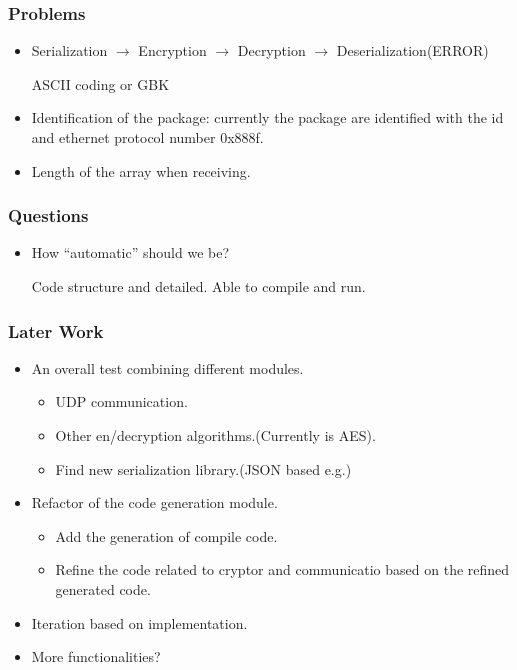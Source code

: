 \documentclass[11pt]{beamer}
\begin{document}
\begin{frame}
\begin{multicols}{2}
\end{multicols}
\end{frame}

\begin{frame}\frametitle{Problems}
\begin{itemize}
\item Serialization $\rightarrow$ Encryption $\rightarrow$ Decryption $\rightarrow$ Deserialization(ERROR)

ASCII coding or GBK

\item Identification of the package: currently the package are identified with the  id and ethernet protocol number 0x888f.

\item Length of the array when receiving.
\end{itemize}
\end{frame}

\begin{frame}\frametitle{Questions}
\begin{itemize}
\item How ``automatic'' should we be?

Code structure and detailed. Able to compile and run.
\end{itemize}
\end{frame}

\begin{frame}\frametitle{Later Work}
\begin{itemize}
\item An overall test combining different modules.
\begin{itemize}
\item UDP communication.
\item Other en/decryption algorithms.(Currently is AES).

\item Find new serialization library.(JSON based e.g.)
\end{itemize}

\item Refactor of the code generation module.
\begin{itemize}
\item Add the generation of compile code.
\item Refine the code related to cryptor and communicatio based on the refined generated code.
\end{itemize}
\item Iteration based on implementation.

\item More functionalities?
\end{itemize}
\end{frame}
\end{document}
